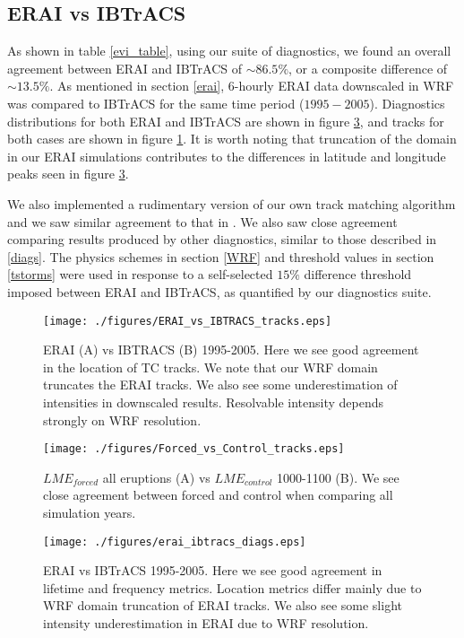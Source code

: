 \documentclass[smallextended]{svjour3}       %
\begin{document}
\subsection{ERAI vs IBTrACS}
As shown in table \ref{evi_table}, using our suite of diagnostics, we found an overall agreement between ERAI and IBTrACS of ${\sim}86.5\%$, or a composite difference of ${\sim}13.5\%$. As mentioned in section \ref{erai}, $6$-hourly ERAI data downscaled in WRF was compared to IBTrACS for the same time period ($1995-2005$). Diagnostics distributions for both ERAI and IBTrACS are shown in figure \ref{evi_diags}, and tracks for both cases are shown in figure \ref{erai_ibtracs_tracks}. It is worth noting that truncation of the domain in our ERAI simulations contributes to the differences in latitude and longitude peaks seen in figure \ref{evi_diags}.  
\par
We also implemented a rudimentary version of our own track matching algorithm and we saw similar agreement to that in \cite{hodges2017well}. We also saw close agreement comparing results produced by other diagnostics, similar to those described in \ref{diags}. The physics schemes in section \ref{WRF} and threshold values in section \ref{tstorms} were used in response to a self-selected $15\%$ difference threshold imposed between ERAI and IBTrACS, as quantified by our diagnostics suite. 

\begin{figure}[!tbp]
\centering
\texttt{[image: ./figures/ERAI\_vs\_IBTRACS\_tracks.eps]}
\caption{ERAI (A) vs IBTRACS (B) 1995-2005. Here we see good agreement in the location of TC tracks. We note that our WRF domain truncates the ERAI tracks. We also see some underestimation of intensities in downscaled results. Resolvable intensity depends strongly on WRF resolution.}
\label{erai_ibtracs_tracks}
\end{figure}


\begin{figure}[!tbp]
\centering
\texttt{[image: ./figures/Forced\_vs\_Control\_tracks.eps]}
\caption{$LME_{forced}$ all eruptions (A) vs $LME_{control}$ 1000-1100 (B). We see close agreement between forced and control when comparing all simulation years.}
\label{forced_ctrl_tracks}
\end{figure}

\begin{figure}[!tbp]
\centering
\texttt{[image: ./figures/erai\_ibtracs\_diags.eps]}
\caption{ERAI vs IBTrACS 1995-2005. Here we see good agreement in lifetime and frequency metrics. Location metrics differ mainly due to WRF domain truncation of ERAI tracks. We also see some slight intensity underestimation in ERAI due to WRF resolution.}
\label{evi_diags}
\end{figure}
\end{document}
